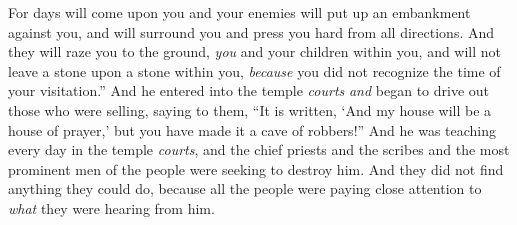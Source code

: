 \begin{biblechapter}
\verse For days will come upon you and your enemies will put up an embankment against you, and will surround you and press you hard from all directions.
\verse And they will raze you to the ground, \textit{you} and your children within you, and will not leave a stone upon a stone within you, \textit{because} you did not recognize the time of your visitation.”
 And he entered into the temple \textit{courts} \textit{and} began to drive out those who were selling,
\verse saying to them, “It is written, ‘And my house will be a house of prayer,’ but you have made it a cave of robbers!”
\verse And he was teaching every day in the temple \textit{courts}, and the chief priests and the scribes and the most prominent men of the people were seeking to destroy him.
\verse And they did not find anything they could do, because all the people were paying close attention to \textit{what} they were hearing from him.
\end{biblechapter}

